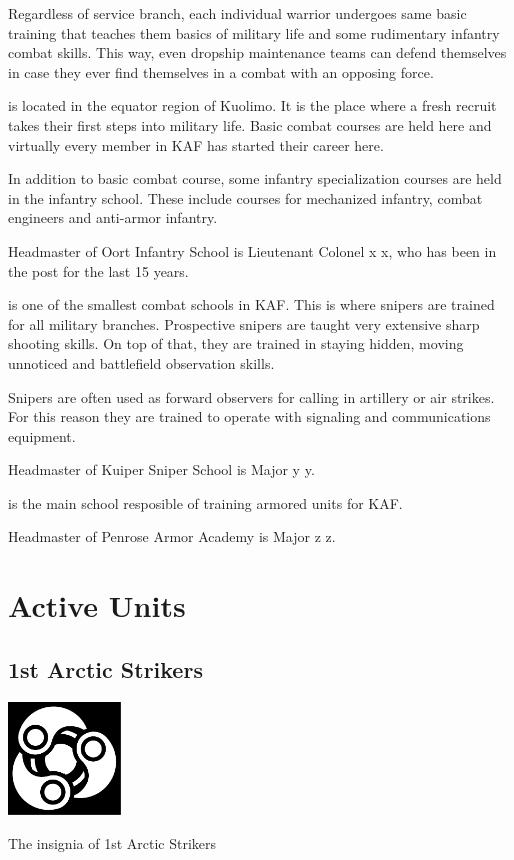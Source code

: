 \documentclass{tufte-book}
\begin{document}
Regardless of service branch, each individual warrior undergoes same basic
training that teaches them basics of military life and some rudimentary
infantry combat skills. This way, even dropship maintenance teams can defend
themselves in case they ever find themselves in a combat with an opposing
force.

 is located in the equator region of Kuolimo.
It is the place where a fresh recruit takes their first steps into military
life. Basic combat courses are held here and virtually every member in KAF
has started their career here.

In addition to basic combat course, some infantry specialization courses are
held in the infantry school. These include courses for mechanized infantry,
combat engineers and anti-armor infantry.

Headmaster of Oort Infantry School is Lieutenant Colonel x x,
who has been in the post for the last 15 years.

 is one of the smallest combat schools in KAF.
This is where snipers are trained for all military branches. Prospective
snipers are taught very extensive sharp shooting skills. On top of that, they
are trained in staying hidden, moving unnoticed and battlefield observation
skills.

Snipers are often used as forward observers for calling in artillery or air
strikes. For this reason they are trained to operate with signaling and
communications equipment.

Headmaster of Kuiper Sniper School is Major y y.

 is the main school resposible of training
armored units for KAF.

Headmaster of Penrose Armor Academy is Major z z.

\chapter{Active Units}
\label{ch:active_units}

\section{1st Arctic Strikers}
\label{sc:arctic_strikers}

\begin{marginfigure}[0\baselineskip]
  \includegraphics[width=3cm]{triple-yin}
  \caption{The insignia of 1st Arctic Strikers}
  \label{fig:arctic_strikers}
\end{marginfigure}
\end{document}
